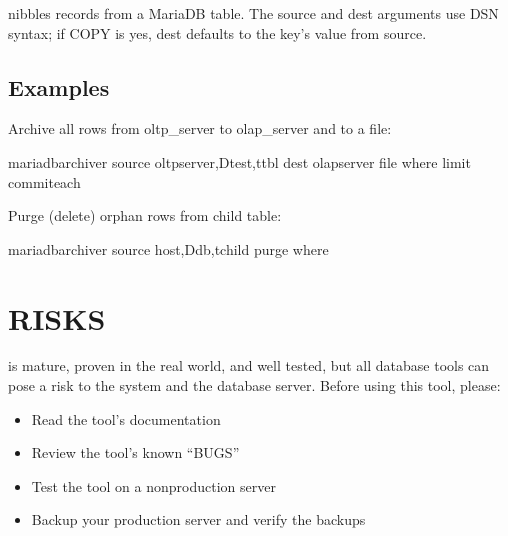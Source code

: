 \documentclass[letterpaper,10pt,english]{sphinxmanual}
\begin{document}
 nibbles records from a MariaDB table.  The \textendash{}source and \textendash{}dest
arguments use DSN syntax; if COPY is yes, \textendash{}dest defaults to the key’s value
from \textendash{}source.


\subsection{Examples}
\label{\detokenize{mariadb-archiver:examples}}
Archive all rows from oltp\_server to olap\_server and to a file:

\begin{sphinxVerbatim}[commandchars=\\\{\}]
mariadb\PYGZhy{}archiver \PYGZhy{}\PYGZhy{}source oltp\PYGZus{}server,Dtest,ttbl \PYGZhy{}\PYGZhy{}dest olap\PYGZus{}server 
  \PYGZhy{}\PYGZhy{}file                            
  \PYGZhy{}\PYGZhy{}where  \PYGZhy{}\PYGZhy{}limit  \PYGZhy{}\PYGZhy{}commit\PYGZhy{}each
\end{sphinxVerbatim}

Purge (delete) orphan rows from child table:

\begin{sphinxVerbatim}[commandchars=\\\{\}]
mariadb\PYGZhy{}archiver \PYGZhy{}\PYGZhy{}source host,Ddb,tchild \PYGZhy{}\PYGZhy{}purge 
  \PYGZhy{}\PYGZhy{}where 
\end{sphinxVerbatim}


\section{RISKS}
\label{\detokenize{mariadb-archiver:risks}}
 is mature, proven in the real world, and well tested,
but all database tools can pose a risk to the system and the database
server.  Before using this tool, please:
\begin{itemize}
\item {} 
Read the tool’s documentation

\item {} 
Review the tool’s known “BUGS”

\item {} 
Test the tool on a non\sphinxhyphen{}production server

\item {} 
Backup your production server and verify the backups

\end{itemize}
\end{document}
